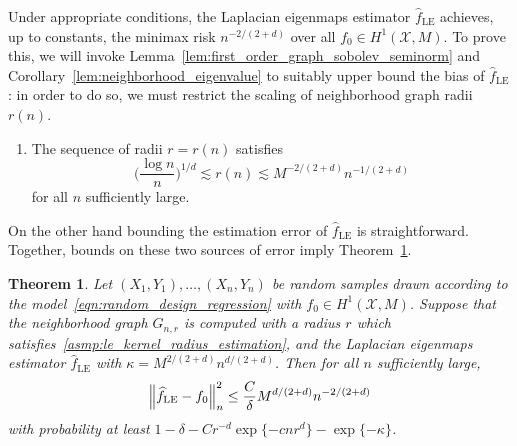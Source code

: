 \documentclass{article}
\newcommand{\1}{\mathbf{1}}
\newcommand{\Xset}{\mathcal{X}}
\newcommand{\wh}[1]{\widehat{#1}}
\newcommand{\LE}{\mathrm{LE}}
\theoremstyle{alden}
\theoremstyle{aldenthm}
\newtheorem{theorem}{Theorem}
\theoremstyle{definition}
\theoremstyle{remark}
\begin{document}
Under appropriate conditions, the Laplacian eigenmaps estimator $\wh{f}_{\LE}$ achieves, up to constants, the minimax risk $n^{-2/(2 + d)}$ over all $f_0 \in H^1(\Xset,M)$. To prove this, we will invoke Lemma~\ref{lem:first_order_graph_sobolev_seminorm} and Corollary~\ref{lem:neighborhood_eigenvalue} to suitably upper bound the bias of $\wh{f}_{\LE}$: in order to do so, we must restrict the scaling of neighborhood graph radii $r(n)$.
\begin{enumerate}[label=(R\arabic*)]
	\item 
	\label{asmp:le_kernel_radius_estimation}
	The sequence of radii $r = r(n)$ satisfies
	\begin{equation*}
	\biggl(\frac{\log n}{n}\biggr)^{1/d} \lesssim r(n) \lesssim M^{-2/(2 + d)}n^{-1/(2 + d)}
	\end{equation*}
	for all $n$ sufficiently large.
\end{enumerate}
On the other hand bounding the estimation error of $\wh{f}_{\LE}$ is straightforward. Together, bounds on these two sources of error imply Theorem~\ref{thm:laplacian_eigenmaps_estimation1}.
\begin{theorem}
	\label{thm:laplacian_eigenmaps_estimation1}
	Let $(X_1,Y_1),\ldots,(X_n,Y_n)$ be random samples drawn according to the model~\eqref{eqn:random_design_regression} with $f_0 \in H^1(\Xset,M)$. Suppose that the neighborhood graph $G_{n,r}$ is computed with a radius $r$ which satisfies~\ref{asmp:le_kernel_radius_estimation}, and the Laplacian eigenmaps estimator $\wh{f}_{\LE}$ with $\kappa = M^{2/(2 + d)}n^{d/(2 + d)}$. Then for all $n$ sufficiently large,
	\begin{equation*}
	\Bigl\|\wh{f}_{\LE} - f_0\Bigr\|_n^2 \leq \frac{C}{\delta} M^{d/(2 + d)} n^{-2/(2 + d)}
	\end{equation*}
	with probability at least $1 - \delta -  Cr^{-d}\exp\{-cnr^d\} - \exp\{-\kappa\}$.
\end{theorem}
\end{document}
